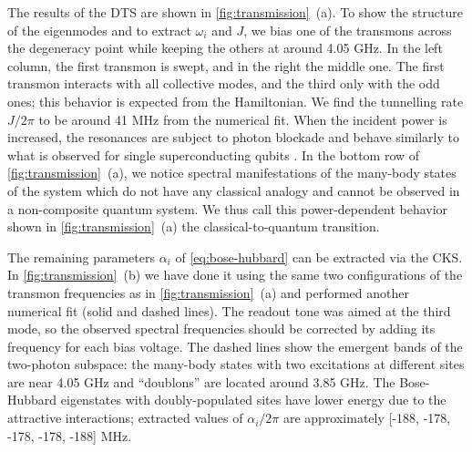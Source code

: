 \documentclass[%
 aps, pra,
 amsmath,amssymb,
 reprint,%
superscriptaddress
]{revtex4-2}
\begin{document}
The results of the DTS are shown in \autoref{fig:transmission}~(a). To show the structure of the eigenmodes and to extract $\omega_i$ and $J$, we bias one of the transmons across the degeneracy point while keeping the others at around 4.05 GHz. In the left column, the first transmon is swept, and in the right the middle one. The first transmon interacts with all collective modes, and the third only with the odd ones; this behavior is expected from the Hamiltonian. We find the tunnelling rate $J/2\pi$ to be around 41 MHz from the numerical fit. When the incident power is increased, the resonances are subject to photon blockade \cite{birnbaum2005photon} and behave similarly to what is observed for single superconducting qubits \cite{astafiev2010resonance}. In the bottom row of \autoref{fig:transmission}~(a), we notice spectral manifestations of the many-body states of the system which do not have any classical analogy and cannot be observed in a non-composite quantum system. We thus call this power-dependent behavior shown in \autoref{fig:transmission}~(a) the classical-to-quantum transition. 


The remaining parameters $\alpha_i$ of \eqref{eq:bose-hubbard} can be extracted via the CKS. In \autoref{fig:transmission}~(b) we have done it using the same two configurations of the transmon frequencies as in \autoref{fig:transmission}~(a) and performed another numerical fit (solid and dashed lines). The readout tone was aimed at the third mode, so the observed spectral frequencies should be corrected by adding its frequency for each bias voltage. The dashed lines show the emergent bands of the two-photon subspace: the many-body states with two excitations at different sites are near 4.05 GHz and ``doublons'' \cite{gorlach2018simulation} are located around 3.85 GHz. The Bose-Hubbard eigenstates with doubly-populated sites have lower energy due to the attractive interactions; extracted values of $\alpha_i/2\pi$ are approximately [-188, -178, -178, -178, -188] MHz. 
\end{document}
